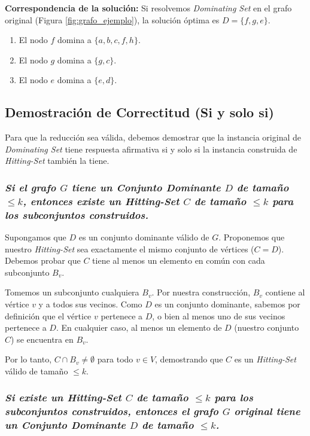 \textbf{Correspondencia de la solución:}
Si resolvemos \textit{Dominating Set} en el grafo original (Figura \ref{fig:grafo_ejemplo}), la solución óptima es $D = \{f, g, e\}$. 
\begin{enumerate}
    \item El nodo \textbf{$f$} domina a $\{a, b, c, f, h\}$.
    \item El nodo \textbf{$g$} domina a $\{g, c\}$.
    \item El nodo \textbf{$e$} domina a $\{e, d\}$.
\end{enumerate}

\subsection{Demostración de Correctitud (Si y solo si)}

Para que la reducción sea válida, debemos demostrar que la instancia original de \textit{Dominating Set} tiene respuesta afirmativa si y solo si la instancia construida de \textit{Hitting-Set} también la tiene.

\subsubsection*{\textit{Si el grafo $G$ tiene un Conjunto Dominante $D$ de tamaño $\leq k$, entonces existe un Hitting-Set $C$ de tamaño $\leq k$ para los subconjuntos construidos.}}


Supongamos que $D$ es un conjunto dominante válido de $G$. Proponemos que nuestro \textit{Hitting-Set} sea exactamente el mismo conjunto de vértices ($C = D$). Debemos probar que $C$ tiene al menos un elemento en común con cada subconjunto $B_v$.

Tomemos un subconjunto cualquiera $B_v$. Por nuestra construcción, $B_v$ contiene al vértice $v$ y a todos sus vecinos. Como $D$ es un conjunto dominante, sabemos por definición que el vértice $v$ pertenece a $D$, o bien al menos uno de sus vecinos pertenece a $D$. En cualquier caso, al menos un elemento de $D$ (nuestro conjunto $C$) se encuentra en $B_v$.

Por lo tanto, $C \cap B_v \neq \emptyset$ para todo $v \in V$, demostrando que $C$ es un \textit{Hitting-Set} válido de tamaño $\leq k$.

\subsubsection*{\textit{Si existe un Hitting-Set $C$ de tamaño $\leq k$ para los subconjuntos construidos, entonces el grafo $G$ original tiene un Conjunto Dominante $D$ de tamaño $\leq k$.}}


